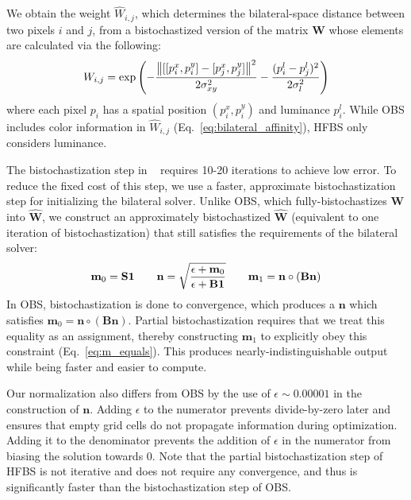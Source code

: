 We obtain the weight $\hat W_{i,j}$, which determines the bilateral-space distance between two pixels $i$ and $j$, from a bistochastized version of the matrix $\mathbf{W}$ whose elements are calculated via the following:
\begin{equation}
W_{i,j} = \exp\left( - { \norm*{ [[p^x_i, p^y_i] - [p^x_j, p^y_j] }^2 \over 2 \sigma_{xy}^2 } -  { ( p^l_i - p^l_j )^2 \over 2 \sigma_{l}^2 }  \right)
\label{eq:hfbs-bilateral_affinity}
\end{equation}
where each pixel $p_i$ has a spatial position $(p^x_i, p^y_i)$ and luminance $p^l_i$.
While OBS includes color information in $\hat W_{i,j}$ (Eq.~\ref{eq:bilateral_affinity}), HFBS only considers luminance.


The bistochastization step in ~\cite{BarronPoole2016} requires 10-20 iterations to achieve low error.
To reduce the fixed cost of this step, we use a faster, approximate bistochastization step for initializing the bilateral solver.
Unlike OBS, which fully-bistochastizes $\mathbf{W}$ into $\hat{\mathbf{W}}$,
we construct an approximately bistochastized $\hat{\mathbf{W}}$ (equivalent to one iteration of bistochastization)
that still satisfies the requirements of the bilateral solver:
\begin{align}
\mathbf{m}_0 = \mathbf{S} \mathbf{1}
\quad\quad
\mathbf{n} = \sqrt{ \epsilon + \mathbf{m}_0 \over \epsilon + \mathbf{B} \mathbf{1} } \quad\quad
\mathbf{m}_1 = \mathbf{n} \circ \left( \mathbf{B} \mathbf{n} \right) \label{eq:m_equals}
\end{align}
In OBS, bistochastization is done to convergence, which produces a $\mathbf{n}$ which satisfies $\mathbf{m}_0 = \mathbf{n} \circ \left( \mathbf{B} \mathbf{n} \right)$.
Partial bistochastization requires that we treat this equality as an assignment, thereby constructing $\mathbf{m}_1$ to explicitly obey this constraint (Eq.~\ref{eq:m_equals}). This produces nearly-indistinguishable output while being faster and easier to compute.

Our normalization also differs from OBS by the use of $\epsilon \sim 0.00001$ in the construction of $\mathbf{n}$.
Adding $\epsilon$ to the numerator prevents divide-by-zero later and
ensures that empty grid cells do not propagate information during optimization. Adding it to the denominator prevents the addition of $\epsilon$ in the numerator from biasing the solution towards $0$.
Note that the partial bistochastization step of HFBS is not iterative and does not require any convergence, and thus is significantly faster than the bistochastization step of OBS.

